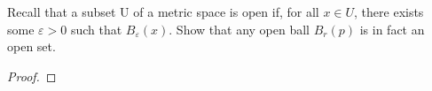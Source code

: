 \documentclass[main.tex]{subfiles}
\begin{document}
\begin{fprob}
    Recall that a subset U of a metric space is open if, for all $x\in U$, there exists some
    $\varepsilon >0$ such that $B_{\varepsilon}(x)$. Show that any open ball $B_r(p)$ is in fact an open set.
\end{fprob}

\begin{proof}
\end{proof}
\end{document}
